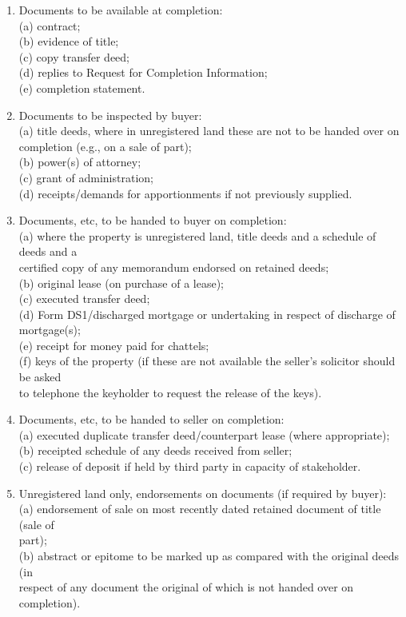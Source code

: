 \documentclass[
]{article}
\providecommand{\tightlist}{%
  \setlength{\itemsep}{0pt}\setlength{\parskip}{0pt}}
\begin{document}
\begin{enumerate}
\tightlist
\item
  Documents to be available at completion:\\
  (a) contract;\\
  (b) evidence of title;\\
  (c) copy transfer deed;\\
  (d) replies to Request for Completion Information;\\
  (e) completion statement.
\item
  Documents to be inspected by buyer:\\
  (a) title deeds, where in unregistered land these are not to be handed
  over on\\
  completion (e.g., on a sale of part);\\
  (b) power(s) of attorney;\\
  (c) grant of administration;\\
  (d) receipts/demands for apportionments if not previously supplied.
\item
  Documents, etc, to be handed to buyer on completion:\\
  (a) where the property is unregistered land, title deeds and a
  schedule of deeds and a\\
  certified copy of any memorandum endorsed on retained deeds;\\
  (b) original lease (on purchase of a lease);\\
  (c) executed transfer deed;\\
  (d) Form DS1/discharged mortgage or undertaking in respect of
  discharge of\\
  mortgage(s);\\
  (e) receipt for money paid for chattels;\\
  (f) keys of the property (if these are not available the seller's
  solicitor should be asked\\
  to telephone the keyholder to request the release of the keys).
\item
  Documents, etc, to be handed to seller on completion:\\
  (a) executed duplicate transfer deed/counterpart lease (where
  appropriate);\\
  (b) receipted schedule of any deeds received from seller;\\
  (c) release of deposit if held by third party in capacity of
  stakeholder.
\item
  Unregistered land only, endorsements on documents (if required by
  buyer):\\
  (a) endorsement of sale on most recently dated retained document of
  title (sale of\\
  part);\\
  (b) abstract or epitome to be marked up as compared with the original
  deeds (in\\
  respect of any document the original of which is not handed over on
  completion).
\end{enumerate}
\end{document}

